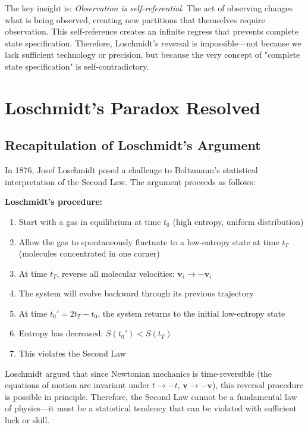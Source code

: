 \documentclass[twocolumn,10pt]{article}
\theoremstyle{definition}
\theoremstyle{remark}
\begin{document}
\noindent The key insight is: \textit{Observation is self-referential.} The act of observing changes what is being observed, creating new partitions that themselves require observation. This self-reference creates an infinite regress that prevents complete state specification. Therefore, Loschmidt's reversal is impossible—not because we lack sufficient technology or precision, but because the very concept of "complete state specification" is self-contradictory.

\section{Loschmidt's Paradox Resolved}
\label{sec:loschmidt}

\subsection{Recapitulation of Loschmidt's Argument}

In 1876, Josef Loschmidt posed a challenge to Boltzmann's statistical interpretation of the Second Law\cite{loschmidt1876}. The argument proceeds as follows:

\vspace{0.2cm}
\noindent\textbf{Loschmidt's procedure:}
\begin{enumerate}
\item Start with a gas in equilibrium at time $t_0$ (high entropy, uniform distribution)
\item Allow the gas to spontaneously fluctuate to a low-entropy state at time $t_T$ (molecules concentrated in one corner)
\item At time $t_T$, reverse all molecular velocities: $\mathbf{v}_i \to -\mathbf{v}_i$
\item The system will evolve backward through its previous trajectory
\item At time $t_0' = 2t_T - t_0$, the system returns to the initial low-entropy state
\item Entropy has decreased: $S(t_0') < S(t_T)$
\item This violates the Second Law
\end{enumerate}

\noindent Loschmidt argued that since Newtonian mechanics is time-reversible (the equations of motion are invariant under $t \to -t$, $\mathbf{v} \to -\mathbf{v}$), this reversal procedure is possible in principle. Therefore, the Second Law cannot be a fundamental law of physics—it must be a statistical tendency that can be violated with sufficient luck or skill.
\end{document}

